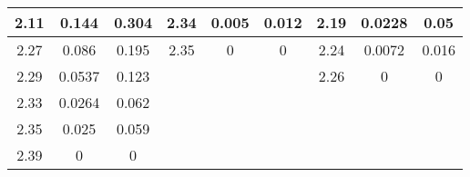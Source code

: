 \begin{table*}[]
\begin{tabular}{|c|c|c|c|c|c|c|c|c|}
2.11        & 0.144        & 0.304      & 2.34       & 0.005      & 0.012        & 2.19       & 0.0228      & 0.05         \\ \hline
2.27        & 0.086        & 0.195      & 2.35       & 0          & 0            & 2.24       & 0.0072      & 0.016        \\ \hline
2.29        & 0.0537       & 0.123      & \multicolumn{3}{c|}{\multirow{4}{*}{}} & 2.26       & 0           & 0            \\ \cline{1-3} \cline{7-9} 
2.33        & 0.0264       & 0.062      & \multicolumn{3}{c|}{}                  & \multicolumn{3}{c|}{\multirow{3}{*}{}}  \\ \cline{1-3}
2.35        & 0.025        & 0.059      & \multicolumn{3}{c|}{}                  & \multicolumn{3}{c|}{}                   \\ \cline{1-3}
2.39        & 0            & 0          & \multicolumn{3}{c|}{}                  & \multicolumn{3}{c|}{}                   \\ \hline
\end{tabular}
\end{table*}